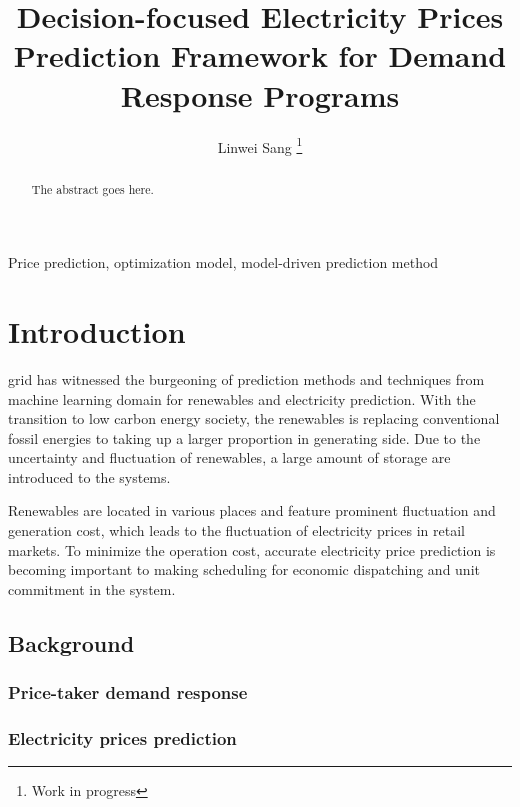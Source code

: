 \documentclass[journal]{IEEEtran}
\begin{document}
\title{Decision-focused Electricity Prices Prediction Framework for Demand Response Programs}

\author{Linwei Sang
\thanks{Work in progress}
}

\maketitle

\begin{abstract}
The abstract goes here.
\end{abstract}

\begin{IEEEkeywords}
Price prediction, optimization model, model-driven prediction method
\end{IEEEkeywords}


\IEEEpeerreviewmaketitle


\section{Introduction}

 grid has witnessed the burgeoning of prediction methods and techniques from machine learning domain for renewables and electricity prediction. With the transition to low carbon energy society, the renewables is replacing conventional fossil energies to taking up a larger proportion in generating side. Due to the uncertainty and fluctuation of renewables, a large amount of storage are introduced to the systems.

Renewables are located in various places and feature prominent fluctuation and generation cost, which leads to the fluctuation of electricity prices in retail markets. To minimize the operation cost, accurate electricity price prediction is becoming important to making scheduling for economic dispatching and unit commitment in the system.

\subsection{Background}
\subsubsection{Price-taker demand response}

\subsubsection{Electricity prices prediction}
\end{document}

